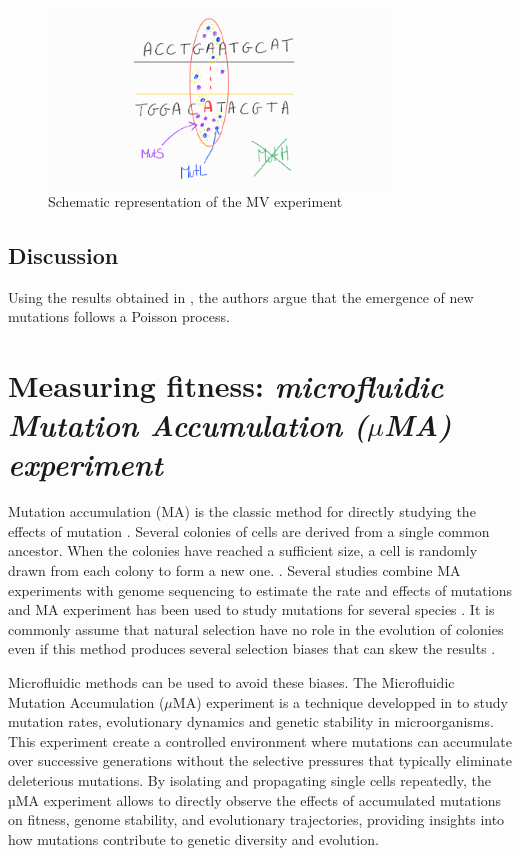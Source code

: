 \begin{figure}
    \centering
    \includegraphics[width=0.8\textwidth]{pictures/syst_MutHLSmodifie.png}
    \caption{Schematic representation of the MV experiment}
    \label{fig:syst_mutHLSmodifie}
\end{figure}

\subsection{Discussion}

Using the results obtained in \cite{robert2018mutation}, the authors argue that the emergence of new mutations follows a Poisson process. 

\section{Measuring fitness: \emph{microfluidic Mutation Accumulation ($\mu$MA) experiment}} 

Mutation accumulation (MA) is the classic method for directly studying the effects of mutation \cite{mukai1964genetic,halligan2009spontaneous}. Several colonies of cells are derived from a single common ancestor. When the colonies have reached a sufficient size, a cell is randomly drawn from each colony to form a new one. .
Several studies combine MA experiments with genome sequencing to estimate the rate and effects of mutations \cite{lynch2016genetic,tenaillon2016tempo} and MA experiment has been used to study mutations for several species \cite{katju2019old,ossowski2010rate,rutter2012fitness, baer2005comparative}. It is commonly assume that natural selection have no role in the evolution of colonies even if this method produces several selection biases that can skew the results \cite{mahilkar2022selection}. 

Microfluidic methods can be used to avoid these biases. The Microfluidic Mutation Accumulation ($\mu$MA) experiment is a technique developped in \cite{robert2018mutation,robert2019real} to study mutation rates, evolutionary dynamics and genetic stability in microorganisms. This experiment create a controlled environment where mutations can accumulate over successive generations without the selective pressures that typically eliminate deleterious mutations. By isolating and propagating single cells repeatedly, the µMA experiment allows to directly observe the effects of accumulated mutations on fitness, genome stability, and evolutionary trajectories, providing insights into how mutations contribute to genetic diversity and evolution. \\

